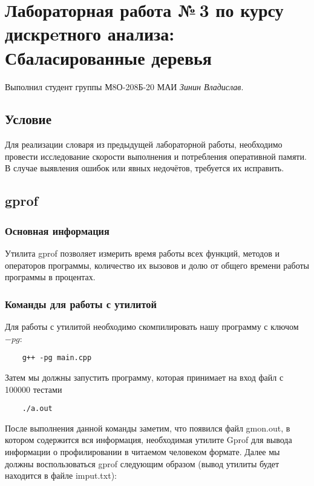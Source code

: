 \documentclass[12pt]{article}
\begin{document}
\section*{Лабораторная работа №\,3 по курсу дискрeтного анализа: Сбаласированные деревья}

Выполнил студент группы М8О-208Б-20 МАИ \textit{Зинин Владислав}.

\subsection*{Условие}

Для реализации словаря из предыдущей лабораторной работы,
необходимо провести исследование скорости выполнения и потребления
оперативной памяти. В случае выявления ошибок или явных недочётов,
требуется их исправить.

\subsection*{gprof}

\subsubsection*{Основная информация}

Утилита gprof позволяет измерить время работы всех функций, методов и операторов
программы, количество их вызовов и долю от общего времени работы программы в 
процентах.

\subsubsection*{Команды для работы с утилитой}

Для работы с утилитой необходимо скомпилировать нашу программу с ключом $-pg$:

\begin{lstlisting}
    g++ -pg main.cpp
\end{lstlisting}

Затем мы должны запустить программу, которая принимает на вход файл с 100000 тестами

\begin{lstlisting}
    ./a.out
\end{lstlisting}

После выполнения данной команды заметим, что появился файл gmon.out, в котором содержится вся информация, 
необходимая утилите Gprof для вывода информации о профилировании в читаемом человеком формате. 
Далее мы должны воспользоваться gprof следующим образом (вывод утилиты будет находится в файле imput.txt):
\end{document}
